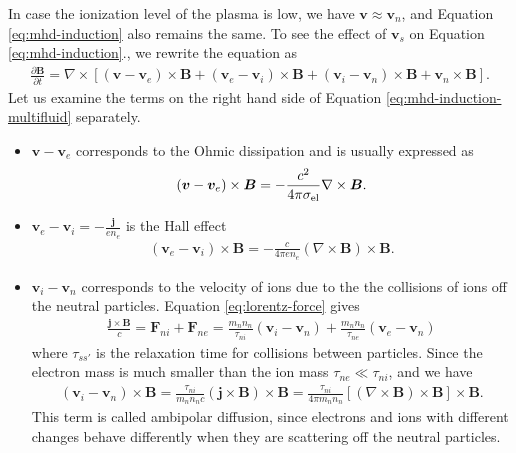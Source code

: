 In case the ionization level of the plasma is low, we have $\boldsymbol{v}\approx \boldsymbol{v}_n$, and Equation \ref{eq:mhd-induction} also remains the same.
To see the effect of $\boldsymbol{v}_s$ on Equation \ref{eq:mhd-induction}., we rewrite the equation as
\begin{eqnarray}\label{eq:mhd-induction-multifluid}
	\frac{\partial \boldsymbol{B}}{\partial t} = \nabla\times\left[(\boldsymbol{v}-\boldsymbol{v}_e)\times \boldsymbol{B} + (\boldsymbol{v}_e-\boldsymbol{v}_i)\times \boldsymbol{B} + (\boldsymbol{v}_i-\boldsymbol{v}_n)\times \boldsymbol{B} + \boldsymbol{v}_n\times\boldsymbol{B}\right].
\end{eqnarray}
Let us examine the terms on the right hand side of Equation \ref{eq:mhd-induction-multifluid} separately.
\begin{itemize}
	\item $\boldsymbol{v}-\boldsymbol{v}_e$ corresponds to the Ohmic dissipation and is usually expressed as 
\begin{eqnarray}
	(\boldsymbol{v}-\boldsymbol{v}_e)\times \boldsymbol{B} = -\frac{c^2}{4\pi\sigma_{\rm el}}\nabla\times \boldsymbol{B}.
\end{eqnarray}
	
	\item $\boldsymbol{v}_e-\boldsymbol{v}_i = -\frac{\boldsymbol{j}}{e n_e}$ is the Hall effect
	\begin{eqnarray}
		(\boldsymbol{v}_e-\boldsymbol{v}_i)\times \boldsymbol{B} = -\frac{c}{4\pi e n_e}(\nabla\times\boldsymbol{B})\times \boldsymbol{B}.
	\end{eqnarray}
	
	\item $\boldsymbol{v}_i-\boldsymbol{v}_n$ corresponds to the velocity of ions due to the the collisions of ions off the neutral particles.
	Equation \ref{eq:lorentz-force} gives
	\begin{eqnarray}
		\frac{\boldsymbol{j}\times\boldsymbol{B}}{c} = \boldsymbol{F}_{ni} + \boldsymbol{F}_{ne} = \frac{m_n n_n}{\tau_{ni}}(\boldsymbol{v}_i-\boldsymbol{v}_n) + \frac{m_n n_n}{\tau_{ne}}(\boldsymbol{v}_e-\boldsymbol{v}_n) 
	\end{eqnarray}
	where $\tau_{ss'}$ is the relaxation time for collisions between particles.
	Since the electron mass is much smaller than the ion mass $\tau_{ne}\ll\tau_{ni}$, and we have 
	\begin{eqnarray}
		(\boldsymbol{v}_i-\boldsymbol{v}_n)\times \boldsymbol{B} = \frac{\tau_{ni}}{m_n n_n c}(\boldsymbol{j}\times\boldsymbol{B})\times\boldsymbol{B} = \frac{\tau_{ni}}{4\pi m_n n_n}\left[(\nabla\times\boldsymbol{B})\times\boldsymbol{B}\right]\times\boldsymbol{B}.
	\end{eqnarray}
	This term is called ambipolar diffusion, since electrons and ions with different changes behave differently when they are scattering off the neutral particles.

\end{itemize}





